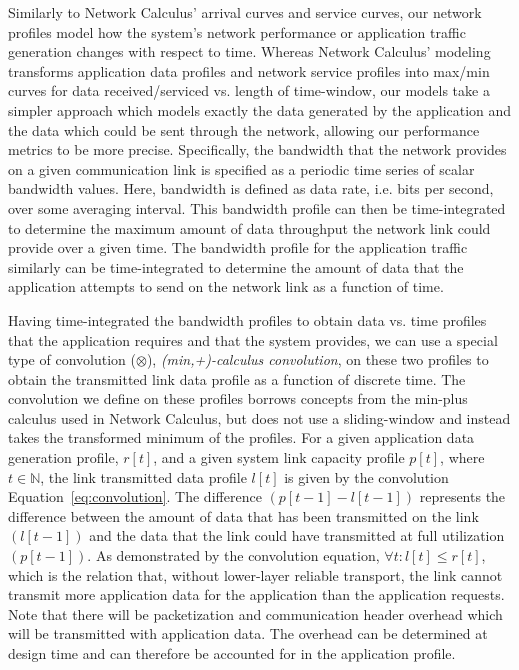 Similarly to Network Calculus' arrival curves and service curves, our
network profiles model how the system's network performance or
application traffic generation changes with respect to time.  Whereas
Network Calculus' modeling transforms application data profiles and
network service profiles into max/min curves for data
received/serviced vs. length of time-window, our models take a simpler
approach which models exactly the data generated by the application
and the data which could be sent through the network, allowing our
performance metrics to be more precise.  Specifically, the bandwidth
that the network provides on a given communication link is specified
as a periodic time series of scalar bandwidth values. Here, bandwidth
is defined as data rate, i.e. bits per second, over some averaging
interval.  This bandwidth profile can then be time-integrated to
determine the maximum amount of data throughput the network link could
provide over a given time.  The bandwidth profile for the application
traffic similarly can be time-integrated to determine the amount of
data that the application attempts to send on the network link as a
function of time.

Having time-integrated the bandwidth profiles to obtain data vs. time
profiles that the application requires and that the system provides,
we can use a special type of convolution ($\otimes$),
\emph{(min,+)-calculus convolution}, on these two profiles to obtain
the transmitted link data profile as a function of discrete time. The
convolution we define on these profiles borrows concepts from the
min-plus calculus used in Network Calculus, but does not use a
sliding-window and instead takes the transformed minimum of the
profiles. For a given application data generation profile, $r[t]$, and
a given system link capacity profile $p[t]$, where $t\in\mathbb{N}$,
the link transmitted data profile $l[t]$ is given by the convolution
Equation~\ref{eq:convolution}. The difference $(p[t-1] - l[t-1])$
represents the difference between the amount of data that has been
transmitted on the link $(l[t-1])$ and the data that the link could
have transmitted at full utilization $(p[t-1])$. As demonstrated by
the convolution equation, $\forall t : l[t] \le r[t]$, which is the
relation that, without lower-layer reliable transport, the link cannot
transmit more application data for the application than the
application requests.  Note that there will be packetization and
communication header overhead which will be transmitted with
application data.  The overhead can be determined at design time and
can therefore be accounted for in the application profile.

